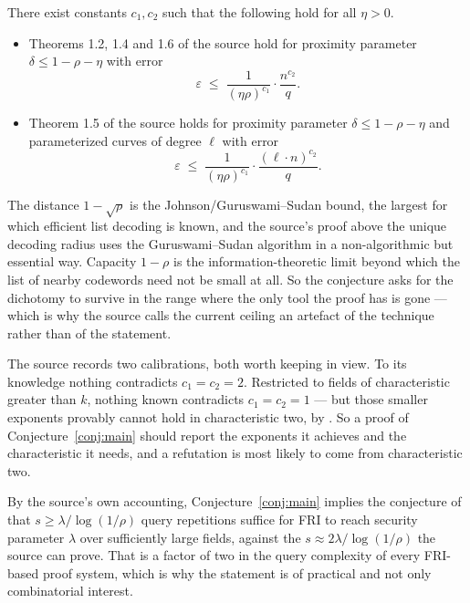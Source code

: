\documentclass{conjura-conjecture}
\newcommand{\eps}{\varepsilon}
\begin{document}
\begin{conjecture}\label{conj:main}
There exist constants $c_{1}, c_{2}$ such that the following hold for all
$\eta > 0$.
\begin{itemize}[nosep]
  \item Theorems 1.2, 1.4 and 1.6 of the source hold for proximity
    parameter $\delta \le 1 - \rho - \eta$ with error
    \[
      \eps \;\le\; \frac{1}{(\eta\rho)^{c_{1}}} \cdot
      \frac{n^{c_{2}}}{q}.
    \]
  \item Theorem 1.5 of the source holds for proximity parameter $\delta
    \le 1 - \rho - \eta$ and parameterized curves of degree $\ell$ with
    error
    \[
      \eps \;\le\; \frac{1}{(\eta\rho)^{c_{1}}} \cdot
      \frac{(\ell \cdot n)^{c_{2}}}{q}.
    \]
\end{itemize}
\end{conjecture}

\begin{remark}
The distance $1 - \sqrt{\rho}$ is the Johnson/Guruswami--Sudan bound, the
largest for which efficient list decoding is known, and the source's
proof above the unique decoding radius uses the Guruswami--Sudan
algorithm in a non-algorithmic but essential way. Capacity $1 - \rho$ is
the information-theoretic limit beyond which the list of nearby
codewords need not be small at all. So the conjecture asks for the
dichotomy to survive in the range where the only tool the proof has is
gone --- which is why the source calls the current ceiling an artefact of
the technique rather than of the statement.
\end{remark}

\begin{remark}
The source records two calibrations, both worth keeping in view. To its
knowledge nothing contradicts $c_{1} = c_{2} = 2$. Restricted to fields
of characteristic greater than $k$, nothing known contradicts $c_{1} =
c_{2} = 1$ --- but those smaller exponents provably cannot hold in
characteristic two, by {\cite[Appendix B]{BGKS20}}. So a proof of
Conjecture~\ref{conj:main} should report the exponents it achieves and
the characteristic it needs, and a refutation is most likely to come from
characteristic two.
\end{remark}

\begin{remark}
By the source's own accounting, Conjecture~\ref{conj:main} implies the
conjecture of {\cite{BBHR18b}} that $s \ge \lambda/\log(1/\rho)$ query
repetitions suffice for FRI to reach security parameter $\lambda$ over
sufficiently large fields, against the $s \approx 2\lambda/\log(1/\rho)$
the source can prove. That is a factor of two in the query complexity of
every FRI-based proof system, which is why the statement is of practical
and not only combinatorial interest.
\end{remark}
\end{document}
